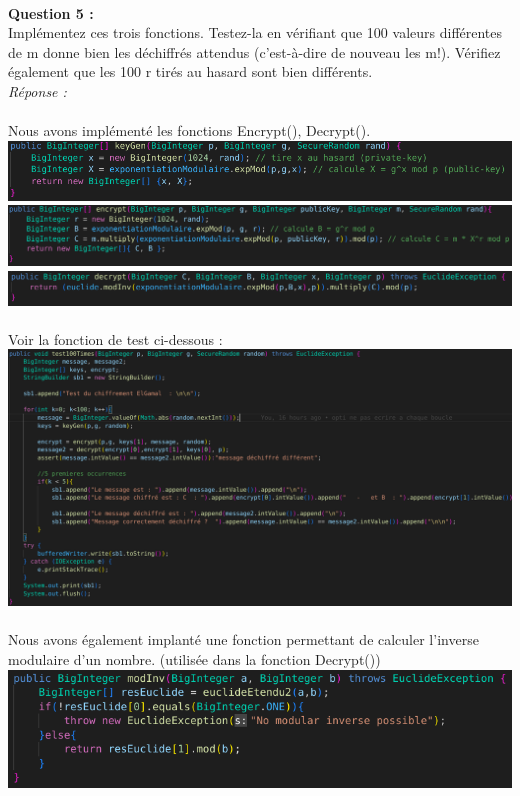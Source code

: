 \documentclass[a4paper,11pt]{article}
\begin{document}
        
        \textbf{\\Question 5 : \\}Implémentez ces trois fonctions. Testez-la en vérifiant que 100 valeurs différentes de m donne bien les déchiffrés attendus (c’est-à-dire de nouveau les m!). Vérifiez également que les 100 r tirés au hasard sont bien différents.
        \textit{\\Réponse :} \\\\Nous avons implémenté les fonctions Encrypt(), Decrypt().\\\includegraphics[scale=0.45]{assets/keygenEG.png}\\\includegraphics[scale=0.42]{assets/encryptEG.png}\\\includegraphics[scale=0.4]{assets/decryptEG.png} \\\\Voir la fonction de test ci-dessous : \\\includegraphics[scale=0.3]{assets/testElgamal.png}
        \\\\Nous avons également implanté une fonction permettant de calculer l'inverse modulaire d'un nombre. (utilisée dans la fonction Decrypt()) \\\includegraphics[scale=0.45]{assets/invMod.png}\\
        
\end{document}
